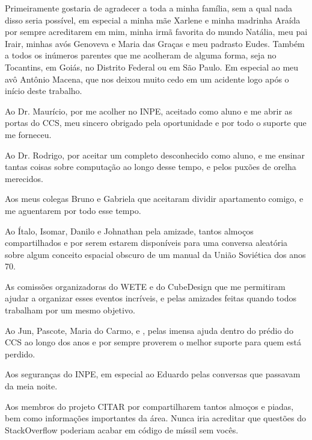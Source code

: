 
\begin{agradecimentos}  %

\hypertarget{estilo:agradecimentos}{} %

Primeiramente gostaria de agradecer a toda a minha família, sem a qual nada disso seria possível, em especial a minha mãe Xarlene e minha madrinha Araída por sempre acreditarem em mim, minha irmã favorita do mundo Natália, meu pai Irair, minhas avós Genoveva e Maria das Graças e meu padrasto Eudes.
Também a todos os inúmeros parentes que me acolheram de alguma forma, seja no Tocantins, em Goiás, no Distrito Federal ou em São Paulo.
Em especial ao meu avô Antônio Macena, que nos deixou muito cedo em um acidente logo após o início deste trabalho.

Ao Dr. Maurício, por me acolher no INPE, aceitado como aluno e me abrir as portas do CCS, meu sincero obrigado pela oportunidade e por todo o suporte que me forneceu.

Ao Dr. Rodrigo, por aceitar um completo desconhecido como aluno, e me ensinar tantas coisas sobre computação ao longo desse tempo, e pelos puxões de orelha merecidos.

Aos meus colegas Bruno e Gabriela que aceitaram dividir apartamento comigo, e me aguentarem por todo esse tempo.

Ao Ítalo, Isomar, Danilo e Johnathan pela amizade, tantos almoços compartilhados e por serem estarem disponíveis para uma conversa aleatória sobre algum conceito espacial obscuro de um manual da União Soviética dos anos 70.

As comissões organizadoras do WETE e do CubeDesign que me permitiram ajudar a organizar esses eventos incríveis, e pelas amizades feitas quando todos trabalham por um mesmo objetivo.

Ao Jun, Pascote, Maria do Carmo, e , pelas imensa ajuda dentro do prédio do CCS ao longo dos anos e por sempre proverem o melhor suporte para quem está perdido.

Aos seguranças do INPE, em especial ao Eduardo pelas conversas que passavam da meia noite.

Aos membros do projeto CITAR por compartilharem tantos almoços e piadas, bem como informações importantes da área.
Nunca iria acreditar que questões do StackOverflow poderiam acabar em código de míssil sem vocês.


\end{agradecimentos}

